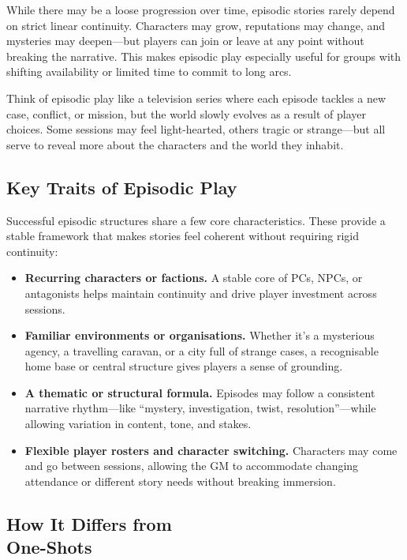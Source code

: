 While there may be a loose progression over time, episodic stories rarely depend on strict linear continuity. Characters may grow, reputations may change, and mysteries may deepen—but players can join or leave at any point without breaking the narrative. This makes episodic play especially useful for groups with shifting availability or limited time to commit to long arcs.

Think of episodic play like a television series where each episode tackles a new case, conflict, or mission, but the world slowly evolves as a result of player choices. Some sessions may feel light-hearted, others tragic or strange—but all serve to reveal more about the characters and the world they inhabit.

\subsection*{Key Traits of Episodic Play}

Successful episodic structures share a few core characteristics. These provide a stable framework that makes stories feel coherent without requiring rigid continuity:

\begin{itemize}
    \item \textbf{Recurring characters or factions.} A stable core of PCs, NPCs, or antagonists helps maintain continuity and drive player investment across sessions.
    
    \item \textbf{Familiar environments or organisations.} Whether it's a mysterious agency, a travelling caravan, or a city full of strange cases, a recognisable home base or central structure gives players a sense of grounding.

    \item \textbf{A thematic or structural formula.} Episodes may follow a consistent narrative rhythm—like “mystery, investigation, twist, resolution”—while allowing variation in content, tone, and stakes.

    \item \textbf{Flexible player rosters and character switching.} Characters may come and go between sessions, allowing the GM to accommodate changing attendance or different story needs without breaking immersion.
\end{itemize}

\subsection*{How It Differs from\\ One-Shots}

